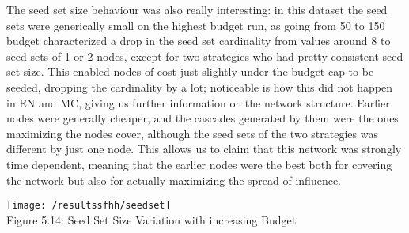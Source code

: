 The seed set size behaviour was also really interesting: in this dataset the seed sets were generically small on the highest budget run, as going from 50 to 150 budget characterized a drop in the seed set cardinality from values around 8 to seed sets of 1 or 2 nodes, except for two strategies who had pretty consistent seed set size. This enabled nodes of cost just slightly under the budget cap to be seeded, dropping the cardinality by a lot; noticeable is how this did not happen in EN and MC, giving us further information on the network structure. Earlier nodes were generally cheaper, and the cascades generated by them were the ones maximizing the nodes cover, although the seed sets of the two strategies was different by just one node.
This allows us to claim that this network was strongly time dependent, meaning that the earlier nodes were the best both for covering the network but also for actually maximizing the spread of influence.

\begin{center}
    \texttt{[image: /resultssfhh/seedset]}
    \\
    Figure 5.14: Seed Set Size Variation with increasing Budget
\end{center}